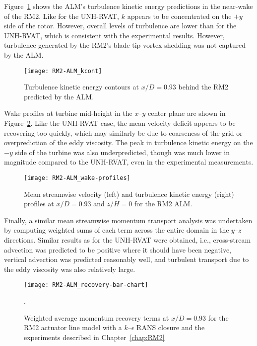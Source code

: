 Figure~\ref{fig:RM2-ALM-kcont} shows the ALM's turbulence kinetic energy
predictions in the near-wake of the RM2. Like for the UNH-RVAT, $k$ appears to
be concentrated on the $+y$ side of the rotor. However, overall levels of
turbulence are lower than for the UNH-RVAT, which is consistent with the
experimental results. However, turbulence generated by the RM2's blade tip
vortex shedding was not captured by the ALM.

\begin{figure}
    \centering

    \texttt{[image: RM2-ALM\_kcont]}

    \caption{Turbulence kinetic energy contours at $x/D=0.93$ behind the RM2
        predicted by the ALM.}

    \label{fig:RM2-ALM-kcont}
\end{figure}

Wake profiles at turbine mid-height in the $x$--$y$ center plane are shown in
Figure~\ref{fig:RM2-ALM-profiles}. Like the UNH-RVAT case, the mean velocity
deficit appears to be recovering too quickly, which may similarly be due to
coarseness of the grid or overprediction of the eddy viscosity. The peak in
turbulence kinetic energy on the $-y$ side of the turbine was also
underpredicted, though was much lower in magnitude compared to the UNH-RVAT,
even in the experimental measurements.

\begin{figure}
    \centering

    \texttt{[image: RM2-ALM\_wake-profiles]}

    \caption{Mean streamwise velocity (left) and turbulence kinetic energy
        (right) profiles at $x/D=0.93$ and $z/H=0$ for the RM2 ALM.}

    \label{fig:RM2-ALM-profiles}
\end{figure}

Finally, a similar mean streamwise momentum transport analysis was undertaken by
computing weighted sums of each term across the entire domain in the $y$--$z$
directions. Similar results as for the UNH-RVAT were obtained, i.e.,
cross-stream advection was predicted to be positive where it should have been
negative, vertical advection was predicted reasonably well, and turbulent
transport due to the eddy viscosity was also relatively large.

\begin{figure}
    \centering

    \texttt{[image: RM2-ALM\_recovery-bar-chart]}

    \caption{Weighted average momentum recovery terms at $x/D=0.93$ for the RM2
        actuator line model with a $k$--$\epsilon$ RANS closure and the experiments
        described in Chapter~\ref{chap:RM2}}.

    \label{fig:RM2-ALM-recovery}
\end{figure}


